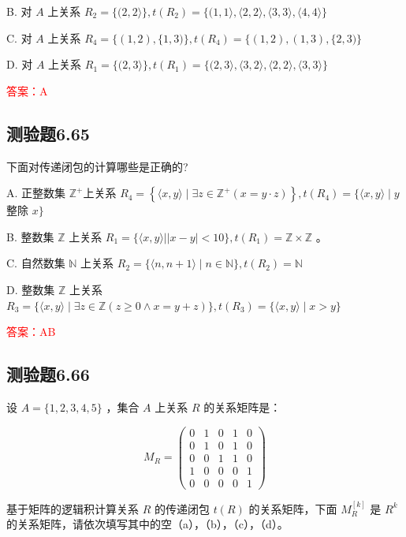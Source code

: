 \documentclass[UTF8, heading=true]{ctexart}
\begin{document}
B. 
对 $A$ 上关系 $R_2=\{(2,2\rangle\}, t\left(R_2\right)=\{(1,1\rangle,\langle 2,2\rangle,\langle 3,3\rangle,\langle 4,4\rangle\}$

C. 
对 $A$ 上关系 $R_4=\{(1,2),\{1,3)\}, t\left(R_4\right)=\{(1,2),(1,3),\{2,3)\}$

D. 
对 $A$ 上关系 $R_1=\{(2,3\rangle\}, t\left(R_1\right)=\{(2,3\rangle,\langle 3,2\rangle,\langle 2,2\rangle,\langle 3,3\rangle\}$

\textcolor{red}{答案：A}


\subsection{测验题6.65}
下面对传递闭包的计算哪些是正确的?

A. 正整数集 $\mathbb{Z}^{+}$上关系 $R_4=\left\{\langle x, y\rangle \mid \exists z \in \mathbb{Z}^{+}(x=y \cdot z)\right\}, t\left(R_4\right)=\{\langle x, y\rangle \mid y$ 整除 $x\}$

B. 整数集 $\mathbb{Z}$ 上关系 $R_1=\{\langle x, y\rangle| | x-y \mid<10\}, t\left(R_1\right)=\mathbb{Z} \times \mathbb{Z}$ 。

C. 自然数集 $\mathbb{N}$ 上关系 $R_2=\{\langle n, n+1\rangle \mid n \in \mathbb{N}\}, t\left(R_2\right)=\mathbb{N}$

D. 整数集 $\mathbb{Z}$ 上关系 $R_3=\{\langle x, y\rangle \mid \exists z \in \mathbb{Z}(z \geq 0 \wedge x=y+z)\}, t\left(R_3\right)=\{\langle x, y\rangle \mid x>y\}$

\textcolor{red}{答案：AB}

\subsection{测验题6.66}

设 $A=\{1,2,3,4,5\}$ ，集合 $A$ 上关系 $R$ 的关系矩阵是：

$$
M_R=\left(\begin{array}{lllll}
0 & 1 & 0 & 1 & 0 \\
0 & 1 & 0 & 1 & 0 \\
0 & 0 & 1 & 1 & 0 \\
1 & 0 & 0 & 0 & 1 \\
0 & 0 & 0 & 0 & 1
\end{array}\right)
$$


基于矩阵的逻辑积计算关系 $R$ 的传递闭包 $t(R)$ 的关系矩阵，下面 $M_R^{[k]}$ 是 $R^k$ 的关系矩阵，请依次填写其中的空（a），（b），（c），（d）。
\end{document}
